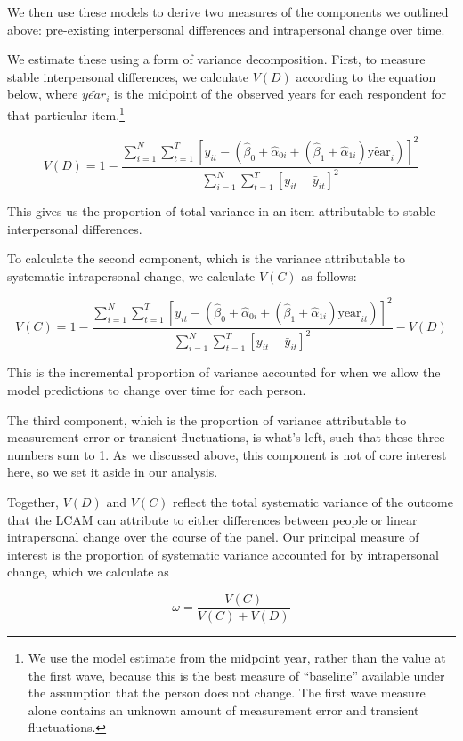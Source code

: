 \documentclass[
  12pt,
]{article}
\begin{document}
We then use these models to derive two measures of the components we
outlined above: pre-existing interpersonal differences and intrapersonal
change over time.

We estimate these using a form of variance decomposition. First, to
measure stable interpersonal differences, we calculate \(V(D)\)
according to the equation below, where \(\widetilde{year_i}\) is the
midpoint of the observed years for each respondent for that particular
item.\footnote{We use the model estimate from the midpoint year, rather
  than the value at the first wave, because this is the best measure of
  ``baseline'' available under the assumption that the person does not
  change. The first wave measure alone contains an unknown amount of
  measurement error and transient fluctuations.}

\[
V(D) = 1 - \frac{\sum_{i=1}^N \sum_{t=1}^T [y_{it} - (\hat{\beta}_0 + \hat{\alpha}_{0i} + (\hat{\beta}_1 + \hat{\alpha}_{1i}) \widetilde{\text{year}}_{i})]^2}{\sum_{i=1}^N \sum_{t=1}^T [y_{it} - \bar{y}_{it}]^2}
\]

This gives us the proportion of total variance in an item attributable
to stable interpersonal differences.

To calculate the second component, which is the variance attributable to
systematic intrapersonal change, we calculate \(V(C)\) as follows:

\[
V(C) = 1 - \frac{\sum_{i=1}^N \sum_{t=1}^T [y_{it} - (\hat{\beta}_0 + \hat{\alpha}_{0i} + (\hat{\beta}_1 + \hat{\alpha}_{1i}) \text{year}_{it})]^2}{\sum_{i=1}^N \sum_{t=1}^T [y_{it} - \bar{y}_{it}]^2} - V(D)
\]

This is the incremental proportion of variance accounted for when we
allow the model predictions to change over time for each person.

The third component, which is the proportion of variance attributable to
measurement error or transient fluctuations, is what's left, such that
these three numbers sum to 1. As we discussed above, this component is
not of core interest here, so we set it aside in our analysis.

Together, \(V(D)\) and \(V(C)\) reflect the total systematic variance of
the outcome that the LCAM can attribute to either differences between
people or linear intrapersonal change over the course of the panel. Our
principal measure of interest is the proportion of systematic variance
accounted for by intrapersonal change, which we calculate as

\[
\omega = \frac{V(C)}{V(C) + V(D)}
\]
\end{document}
